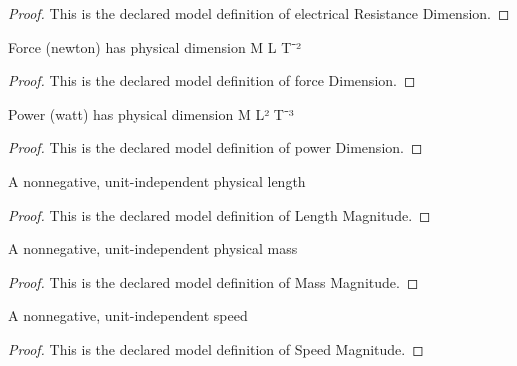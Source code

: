 \begin{proof}
  This is the declared model definition of electrical Resistance Dimension.
\end{proof}
\begin{definition}
  \label{def:physics:phyx-mini-0981:phyxminiproblems-problemphyxmini0981-forcedimension}
  Force (newton) has physical dimension M L T⁻²
\end{definition}
\begin{proof}
  This is the declared model definition of force Dimension.
\end{proof}
\begin{definition}
  \label{def:physics:phyx-mini-0981:phyxminiproblems-problemphyxmini0981-powerdimension}
  Power (watt) has physical dimension M L² T⁻³
\end{definition}
\begin{proof}
  This is the declared model definition of power Dimension.
\end{proof}
\begin{definition}
  \label{def:physics:phyx-mini-0981:phyxminiproblems-problemphyxmini0981-lengthmagnitude}
  A nonnegative, unit-independent physical length
\end{definition}
\begin{proof}
  This is the declared model definition of Length Magnitude.
\end{proof}
\begin{definition}
  \label{def:physics:phyx-mini-0981:phyxminiproblems-problemphyxmini0981-massmagnitude}
  A nonnegative, unit-independent physical mass
\end{definition}
\begin{proof}
  This is the declared model definition of Mass Magnitude.
\end{proof}
\begin{definition}
  \label{def:physics:phyx-mini-0981:phyxminiproblems-problemphyxmini0981-speedmagnitude}
  A nonnegative, unit-independent speed
\end{definition}
\begin{proof}
  This is the declared model definition of Speed Magnitude.
\end{proof}
